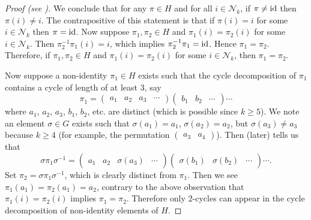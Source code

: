 \begin{proof}[Proof (see {\cite[Theorem 4.24]{dummit_foote_2004}})]
    We conclude that for any $\pi \in H$ and for all $i \in \mathcal{N}_k$, if $\pi \neq \mathrm{id}$ then $\pi(i) \neq i$. The contrapositive of this statement is that if $\pi(i) = i$ for some $i \in \mathcal{N}_k$ then $\pi = \mathrm{id}$. Now suppose $\pi_1, \pi_2 \in H$ and $\pi_1(i) = \pi_2(i)$ for some $i \in \mathcal{N}_{k}$. Then $\pi_2^{-1}\pi_1(i) = i$, which implies $\pi_2^{-1}\pi_1 = \mathrm{id}$. Hence $\pi_1 = \pi_2$. Therefore, if $\pi_1, \pi_2 \in H$ and $\pi_1(i) = \pi_2(i)$ for some $i \in \mathcal{N}_{k}$, then $\pi_1 = \pi_2$.

    Now suppose a non-identity $\pi_1 \in H$ exists such that the cycle decomposition of $\pi_1$ contains a cycle of length of at least 3, say
    \[
        \pi_1 = \begin{pmatrix}a_1&a_2&a_3&\cdots\end{pmatrix} \begin{pmatrix}b_1&b_2&\cdots\end{pmatrix}\cdots
    \]
    where $a_1$, $a_2$, $a_3$, $b_1$, $b_2$, etc. are distinct (which is possible since $k \geq 5$). We note an element $\sigma \in G$ exists such that $\sigma(a_1) = a_1$, $\sigma(a_2) = a_2$, but $\sigma(a_3) \neq a_3$ because $k \geq 4$ (for example, the permutation $\begin{pmatrix}a_3 & a_4\end{pmatrix}$). Then  (later) tells us that
    \[
        \sigma\pi_1\sigma^{-1} = \begin{pmatrix}a_1&a_2&\sigma(a_3)&\cdots\end{pmatrix} \begin{pmatrix}\sigma(b_1)&\sigma(b_2)&\cdots\end{pmatrix}\cdots.
    \]
    Set $\pi_2 = \sigma\pi_1\sigma^{-1}$, which is clearly distinct from $\pi_1$. Then we see $\pi_1(a_1) = \pi_2(a_1) = a_2$, contrary to the above observation that $\pi_1(i) = \pi_2(i)$ implies $\pi_1 = \pi_2$. Therefore only 2-cycles can appear in the cycle decomposition of non-identity elements of $H$.


\end{proof}
